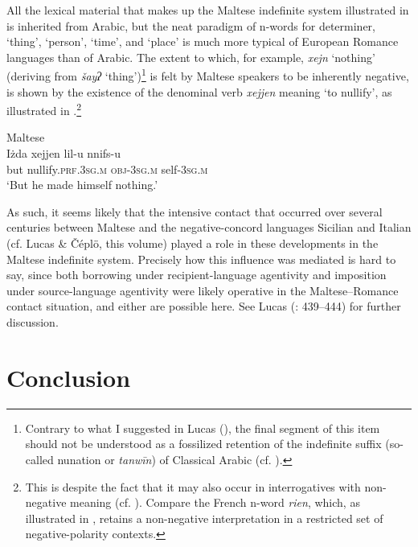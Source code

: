 \documentclass[output=paper]{langsci/langscibook}
\begin{document}
All the lexical material that makes up the Maltese indefinite system illustrated in  is inherited from Arabic, but the neat paradigm of n-words for determiner, ‘thing’, ‘person’, ‘time’, and ‘place’ is much more typical of European Romance languages than of Arabic. The extent to which, for example, \textit{xejn} ‘nothing’ (deriving from \textit{šayʔ} ‘thing’)\footnote{Contrary to what I suggested in Lucas (\citeyear[83--84]{Lucas2009}), the final segment of this item should not be understood as a fossilized retention of the indefinite suffix (so-called nunation or \textit{tanwīn}) of Classical Arabic (cf. \citealt{LucasSpagnol2019}).} is felt by Maltese speakers to be inherently negative, is shown by the existence of the denominal verb \textit{xejjen} meaning ‘to nullify’, as illustrated in .\footnote{This is despite the fact that it may also occur in interrogatives with non-negative meaning (cf. \citealt{CamilleriSadler2017}). Compare the French n-word \textit{rien}, which, as illustrated in , retains a non-negative interpretation in a restricted set of negative-polarity contexts.} 

\ea\label{ex:mlt1}
{       Maltese \citep[441]{Lucas2013}}\\
\gll Iżda xejjen lil-u nnifs-u\\
     but nullify.\textsc{prf.3sg.m} \textsc{obj-3sg.m} self-\textsc{3sg.m}\\
\glt ‘But he made himself nothing.’
\z

As such, it seems likely that the intensive contact that occurred over several centuries between Maltese and the negative-concord languages Sicilian and Italian (cf. Lucas \& Čéplö, this volume) played a role in these developments in the Maltese indefinite system. Precisely how this influence was mediated is hard to say, since both borrowing under recipient-language agentivity and imposition under source-language agentivity were likely operative in the Maltese–Romance contact situation, and either are possible here. See Lucas (\citeyear{Lucas2013}: 439–444) for further discussion.

\section{Conclusion}
\end{document}
